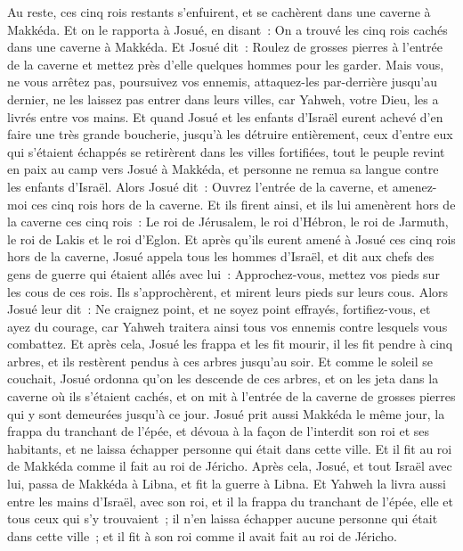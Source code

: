 \begin{multicols}{2}
Au reste, ces cinq rois restants s'enfuirent, et se cachèrent dans une caverne à Makkéda.
Et on le rapporta à Josué, en disant~: On a trouvé les cinq rois cachés dans une caverne à Makkéda.
Et Josué dit~: Roulez de grosses pierres à l'entrée de la caverne et mettez près d'elle quelques hommes pour les garder.
Mais vous, ne vous arrêtez pas, poursuivez vos ennemis, attaquez-les par-derrière jusqu'au dernier, ne les laissez pas entrer dans leurs villes, car Yahweh, votre Dieu, les a livrés entre vos mains.
Et quand Josué et les enfants d'Israël eurent achevé d'en faire une très grande boucherie, jusqu'à les détruire entièrement, ceux d'entre eux qui s'étaient échappés se retirèrent dans les villes fortifiées,
tout le peuple revint en paix au camp vers Josué à Makkéda, et personne ne remua sa langue contre les enfants d'Israël.
Alors Josué dit~: Ouvrez l'entrée de la caverne, et amenez-moi ces cinq rois hors de la caverne.
Et ils firent ainsi, et ils lui amenèrent hors de la caverne ces cinq rois~: Le roi de Jérusalem, le roi d'Hébron, le roi de Jarmuth, le roi de Lakis et le roi d'Eglon.
Et après qu'ils eurent amené à Josué ces cinq rois hors de la caverne, Josué appela tous les hommes d'Israël, et dit aux chefs des gens de guerre qui étaient allés avec lui~: Approchez-vous, mettez vos pieds sur les cous de ces rois. Ils s'approchèrent, et mirent leurs pieds sur leurs cous.
Alors Josué leur dit~: Ne craignez point, et ne soyez point effrayés, fortifiez-vous, et ayez du courage, car Yahweh traitera ainsi tous vos ennemis contre lesquels vous combattez.
Et après cela, Josué les frappa et les fit mourir, il les fit pendre à cinq arbres, et ils restèrent pendus à ces arbres jusqu'au soir.
Et comme le soleil se couchait, Josué ordonna qu'on les descende de ces arbres, et on les jeta dans la caverne où ils s'étaient cachés, et on mit à l'entrée de la caverne de grosses pierres qui y sont demeurées jusqu'à ce jour.
Josué prit aussi Makkéda le même jour, la frappa du tranchant de l'épée, et dévoua à la façon de l'interdit son roi et ses habitants, et ne laissa échapper personne qui était dans cette ville. Et il fit au roi de Makkéda comme il fait au roi de Jéricho.
Après cela, Josué, et tout Israël avec lui, passa de Makkéda à Libna, et fit la guerre à Libna.
Et Yahweh la livra aussi entre les mains d'Israël, avec son roi, et il la frappa du tranchant de l'épée, elle et tous ceux qui s'y trouvaient~; il n'en laissa échapper aucune personne qui était dans cette ville~; et il fit à son roi comme il avait fait au roi de Jéricho.

\end{multicols}
